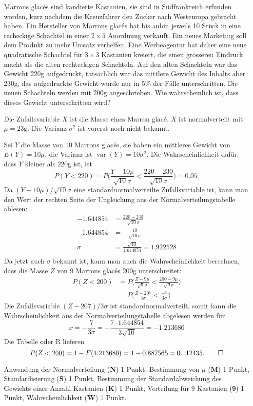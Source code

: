 Marrons glac\'es sind kandierte Kastanien, sie sind in Südfrankreich
erfunden worden, kurz nachdem die Kreuzfahrer den Zucker nach Westeuropa
gebracht haben. Ein Hersteller von Marrons glac\'es hat bis anhin
jeweils 10 Stück in eine recheckige Schachtel in einer $2\times 5$
Anordnung verkauft. Ein neues Marketing soll dem Produkt zu mehr
Umsatz verhelfen. Eine Werbeagentur hat daher eine neue quadratische Schachtel 
für $3\times 3$ Kastanien kreiert, die einen grösseren Eindruck
macht als die alten rechteckigen Schachteln. Auf den alten Schachteln
war das Gewicht 220g aufgedruckt, tatsächlich war das mittlere
Gewicht des Inhalts aber 230g, das aufgedruckte Gewicht wurde
nur in 5\% der Fälle unterschritten. Die neuen Schachteln werden mit
200g angeschrieben. Wie wahrscheinlich ist, dass dieses Gewicht unterschritten
wird?

\begin{loesung}
Die Zufallsvariable $X$ ist die Masse eines Marron glac\'e. $X$ ist
normalverteilt mit $\mu = 23\text{g}$. Die Varianz $\sigma^2$ ist vorerst
noch nicht bekannt.

Sei $Y$ die Masse von 10 Marrons glac\'es, sie haben ein mittleres Gewicht von
$E(Y)=10\mu$, die Varianz ist $\operatorname{var}(Y)=10\sigma^2$.
Die Wahrscheinlichkeit dafür, dass $Y$ kleiner als $220$g ist, ist
\[
P(Y<220)=P\biggl(\frac{Y-10\mu}{\sqrt{10}\sigma}<\frac{220-230}{\sqrt{10}\sigma}\biggr)=0.05.
\]
Da $(Y-10\mu)/\sqrt{10}\sigma$ eine standardnormalverteilte Zufallsvariable
ist, kann man den Wert der rechten Seite der Ungleichung aus der
Normalverteilungstabelle ablesen:
\begin{align*}
-1.644854&= \frac{220-230}{\sqrt{10}\sigma}\\
-1.644854&= -\frac{10}{\sqrt{10}\sigma}\\
\sigma &= \frac{\sqrt{10}}{1.644854}=1.922528\\
\end{align*}
Da jetzt auch $\sigma$ bekannt ist, kann man auch die Wahrscheinlichkeit
berechnen, dass die Masse $Z$ von 9 Marrons glac\'es 200g unterschreitet:
\begin{align*}
P(Z<200)
&=
P\biggl(\frac{Z-9\mu}{\sqrt{9}\sigma}<\frac{200-9\mu}{\sqrt{9}\sigma} \biggr)
\\
&=
P\biggl(\frac{Z-207}{3\sigma}<\frac{-7}{3\sigma} \biggr)
\end{align*}
Die Zufallsvariable $(Z-207)/3\sigma$ ist standardnormalverteilt, somit
kann die Wahrscheinlichkeit aus der Normalverteilungstabelle abgelesen
werden für
\[
x=-\frac{7}{3\sigma}=-\frac{7\cdot1.644854}{3\sqrt{10}}=-1.213680
\]
Die Tabelle oder R lieferen
\[
P(Z<200)=1-F(1.213680)=1-0.887565=0.112435.
\qedhere
\]
\end{loesung}


\begin{bewertung}
Anwendung der Normalverteilung ({\bf N}) 1 Punkt,
Bestimmung von $\mu$ ({\bf M}) 1 Punkt,
Standardisierung ({\bf S}) 1 Punkt,
Bestimmung der Standardabweichung des Gewichts einer Anzahl Kastanien ({\bf K}) 1 Punkt,
Verteilung für 9 Kastanien ({\bf 9}) 1 Punkt,
Wahrscheinlichkeit ({\bf W}) 1 Punkt.
\end{bewertung}



